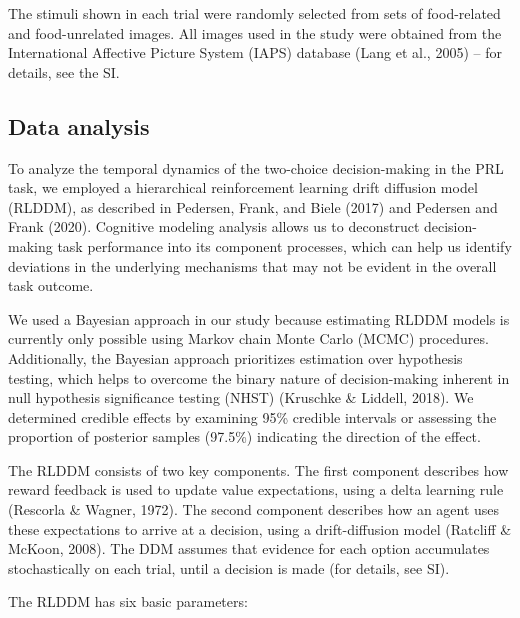 \documentclass[
  man,floatsintext]{apa6}
\begin{document}
The stimuli shown in each trial were randomly selected from sets of food-related and food-unrelated images. All images used in the study were obtained from the International Affective Picture System (IAPS) database (Lang et al., 2005) -- for details, see the SI.

\hypertarget{data-analysis}{%
\subsection{Data analysis}\label{data-analysis}}

To analyze the temporal dynamics of the two-choice decision-making in the PRL task, we employed a hierarchical reinforcement learning drift diffusion model (RLDDM), as described in Pedersen, Frank, and Biele (2017) and Pedersen and Frank (2020). Cognitive modeling analysis allows us to deconstruct decision-making task performance into its component processes, which can help us identify deviations in the underlying mechanisms that may not be evident in the overall task outcome.

We used a Bayesian approach in our study because estimating RLDDM models is currently only possible using Markov chain Monte Carlo (MCMC) procedures. Additionally, the Bayesian approach prioritizes estimation over hypothesis testing, which helps to overcome the binary nature of decision-making inherent in null hypothesis significance testing (NHST) (Kruschke \& Liddell, 2018). We determined credible effects by examining 95\% credible intervals or assessing the proportion of posterior samples (97.5\%) indicating the direction of the effect.

The RLDDM consists of two key components. The first component describes how reward feedback is used to update value expectations, using a delta learning rule (Rescorla \& Wagner, 1972). The second component describes how an agent uses these expectations to arrive at a decision, using a drift-diffusion model (Ratcliff \& McKoon, 2008). The DDM assumes that evidence for each option accumulates stochastically on each trial, until a decision is made (for details, see SI).

The RLDDM has six basic parameters:
\end{document}

